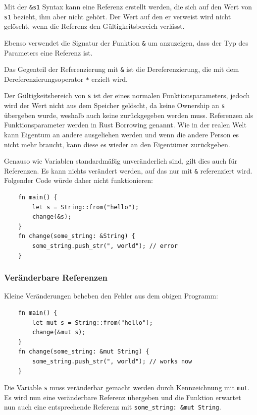 Mit der \verb"&s1" Syntax kann eine Referenz erstellt werden, die sich auf den Wert von \verb"s1" bezieht, ihm aber nicht gehört. Der Wert auf den er verweist wird nicht gelöscht, wenn die Referenz den Gültigkeitsbereich verlässt.

Ebenso verwendet die Signatur der Funktion \verb"&" um anzuzeigen, dass der Typ des Parameters eine Referenz ist.

Das Gegenteil der Referenzierung mit \verb"&" ist die Dereferenzierung, die mit dem Dereferenzierungsoperator \verb"*" erzielt wird.

Der Gültigkeitsbereich von \verb"s" ist der eines normalen Funktionsparameters, jedoch wird der Wert nicht aus dem Speicher gelöscht, da keine Ownership an \verb"s" übergeben wurde, weshalb auch keine zurückgegeben werden muss. Referenzen als Funktionsparameter werden in Rust \glqq Borrowing\grqq{} genannt. Wie in der realen Welt kann Eigentum an andere ausgeliehen werden und wenn die andere Person es nicht mehr braucht, kann diese es wieder an den Eigentümer zurückgeben.

Genauso wie Variablen standardmäßig unveränderlich sind, gilt dies auch für Referenzen. Es kann nichts verändert werden, auf das nur mit \verb"&" referenziert wird. Folgender Code würde daher nicht funktionieren:

\begin{lstlisting}
    fn main() {
        let s = String::from("hello");
        change(&s);
    }
    fn change(some_string: &String) {
        some_string.push_str(", world"); // error
    }
\end{lstlisting}

\subsubsection{Veränderbare Referenzen}

Kleine Veränderungen beheben den Fehler aus dem obigen Programm:

\begin{lstlisting}
    fn main() {
        let mut s = String::from("hello");
        change(&mut s);
    }
    fn change(some_string: &mut String) {
        some_string.push_str(", world"); // works now
    }
\end{lstlisting}

Die Variable \verb"s" muss veränderbar gemacht werden durch Kennzeichnung mit \verb"mut". Es wird nun eine veränderbare Referenz übergeben und die Funktion erwartet nun auch eine entsprechende Referenz mit \verb"some_string: &mut String".

